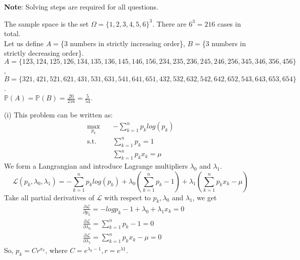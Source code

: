 \documentclass{homework}
\begin{document}
\maketitle
\textbf{Note}: Solving steps are required for all questions.

\question %
The sample space is the set $\Omega=\{1,2,3,4,5,6\}^{3}$. There are $6^3=216$ cases in total. \\
Let us define $A=$\{3 numbers in strictly increasing order\}, 
$B=$\{3 numbers in strictly decreasing order\}. \\
$A=\{123,124,125,126,134,135,136,145,146,156,234,235,236,245,246,256,345,346,356,456\}$,\\
$B=\{321,421,521,621,431,531,631,541,641,651,432,532,632,542,642,652,543,643,653,654\}$.\\
$\mathbb{P}(A)=\mathbb{P}(B)=\frac{20}{216}=\frac{5}{54}$.

\question %
(i) This problem can be written as:\\
\begin{equation}
    \begin{aligned}
        \max_{p_{k}} \quad & -\sum_{k=1}^{n}p_{k}log(p_{k}) \\
        \textrm{s.t.} \quad & \sum_{k=1}^{n}p_{k}=1\\
        &\sum_{k=1}^{n}p_{k}x_{k}=\mu
    \end{aligned}
\end{equation}
We form a Langrangian and introduce Lagrange multipliers $\lambda_{0}$ and $\lambda_{1}$.
\begin{equation}
    \mathcal{L}(p_{k}, \lambda_{0}, \lambda_{1})=-\sum_{k=1}^{n}p_{k}log(p_{k})+
    \lambda_{0}(\sum_{k=1}^{n}p_{k}-1)+
    \lambda_{1}(\sum_{k=1}^{n}p_{k}x_{k}-\mu)
\end{equation}
Take all partial derivatives of $\mathcal{L}$ with respect to $p_{k}, \lambda_{0}$ and $\lambda_{1}$, we get
\begin{equation}
    \begin{aligned}
        &\frac{\partial \mathcal{L}}{\partial p_{k}}=-logp_{k}-1+\lambda_{0}+\lambda_{1}x_{k}=0\\
        &\frac{\partial \mathcal{L}}{\partial \lambda_{0}}=\sum_{k=1}^{n}p_{k}-1=0\\
        &\frac{\partial \mathcal{L}}{\partial \lambda_{1}}=\sum_{k=1}^{n}p_{k}x_{k}-\mu=0
    \end{aligned}
\end{equation}
So, $p_{k}=Cr^{x_{k}}$, where $C=e^{\lambda_{0}-1}, r=e^{\lambda{1}}$.
\end{document}
